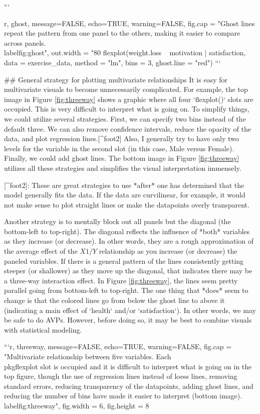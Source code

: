 {{{{{{{{{{{```{r, ghost, message=FALSE, echo=TRUE, warning=FALSE, fig.cap = "Ghost lines repeat the pattern from one panel to the others, making it easier to compare across panels. \\label{fig:ghost}", out.width = "80%
flexplot(weight.loss ~ motivation | satisfaction, 
             data = exercise_data, method = "lm", 
             bins = 3, ghost.line = "red")
```


## General strategy for plotting multivariate relationships
It is easy for multivariate visuals to become unnecessarily complicated. For example, the top image in Figure \ref{fig:threeway} shows a graphic where all four `flexplot()` slots are occupied. This is very difficult to interpret what is going on. To simplify things, we could utilize several strategies. First, we can specify two bins instead of the default three. We can also remove confidence intervals, reduce the opacity of the data, and plot regression lines.[^foot2] Also, I generally try to have only two levels for the variable in the second slot (in this case, Male versus Female). Finally, we could add ghost lines. The bottom image in Figure \ref{fig:threeway} utilizes all these strategies and simplifies the visual interpretation immensely.

[^foot2]: These are great strategies to use *after* one has determined that the model generally fits the data. If the data are curvilinear, for example, it would not make sense to plot straight lines or make the datapoints overly transparent. 

Another strategy is to mentally block out all panels but the diagonal (the bottom-left to top-right). The diagonal reflects the influence of *both* variables as they increase (or decrease). In other words, they are a rough approximation of the average effect of the $X1/Y$ relationship as you increase (or decrease) the paneled variables. If there is a general pattern of the lines consistently getting steeper (or shallower) as they move up the diagonal, that indicates there may be a three-way interaction effect. In Figure \ref{fig:threeway}, the lines seem pretty parallel going from bottom-left to top-right. The one thing that *does* seem to change is that the colored lines go from below the ghost line to above it (indicating a main effect of `health` and/or `satisfaction`). In other words, we may be safe to do AVPs. However, before doing so, it may be best to combine visuals with statistical modeling.

```{r, threeway, message=FALSE, echo=TRUE, warning=FALSE, fig.cap = "Multivariate relationship between five variables. Each \\pkg{flexplot} slot is occupied and it is difficult to interpret what is going on in the top figure, though the use of regression lines instead of loess lines, removing standard errors, reducing transparency of the datapoints, adding ghost lines, and reducing the number of bins have made it  easier to interpret (bottom image).  \\label{fig:threeway}", fig.width = 6, fig.height = 8}


}}}}}}}}}}}}
